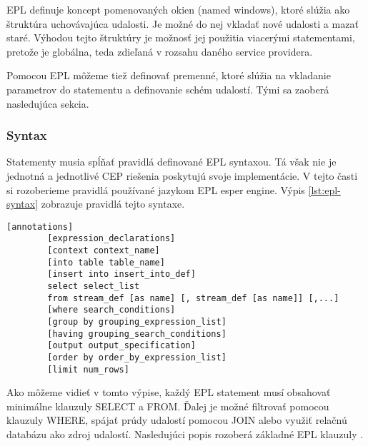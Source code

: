 		EPL definuje koncept pomenovaných okien (named windows), ktoré slúžia ako štruktúra uchovávajúca udalosti. Je možné do nej vkladať nové udalosti a mazať staré. Výhodou tejto štruktúry je možnosť jej použitia viacerými statementami, pretože je globálna, teda zdieľaná v rozsahu daného service providera.	
		
		Pomocou EPL môžeme tiež definovať premenné, ktoré slúžia na vkladanie parametrov do statementu a definovanie schém udalostí. Tými sa zaoberá nasledujúca sekcia.
		
		\subsubsection{Syntax}
		Statementy musia spĺňať pravidlá definované EPL syntaxou. Tá však nie je jednotná a jednotlivé CEP riešenia poskytujú svoje implementácie. V tejto časti si rozoberieme pravidlá používané jazykom EPL esper engine. Výpis \ref{lst:epl-syntax} zobrazuje pravidlá tejto syntaxe.
		
		\begin{lstlisting}[label=lst:epl-syntax,caption=Vzor EPL syntaxe]
		[annotations]
		[expression_declarations]
		[context context_name]
		[into table table_name]
		[insert into insert_into_def]
		select select_list
		from stream_def [as name] [, stream_def [as name]] [,...]
		[where search_conditions]
		[group by grouping_expression_list]
		[having grouping_search_conditions]
		[output output_specification]
		[order by order_by_expression_list]
		[limit num_rows]
		\end{lstlisting}

		Ako môžeme vidieť v tomto výpise, každý EPL statement musí obsahovať minimálne klauzuly SELECT a FROM. Ďalej je možné filtrovať pomocou klauzuly WHERE, spájať prúdy udalostí pomocou JOIN alebo využiť relačnú databázu ako zdroj udalostí. Nasledujúci popis rozoberá základné EPL klauzuly \cite{web:esper-doc}.
		
